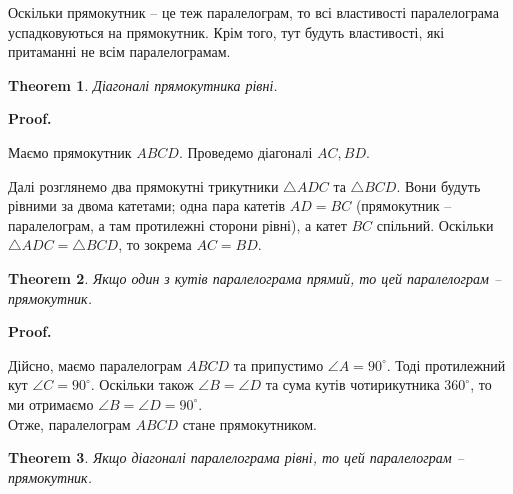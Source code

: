 \documentclass[a4paper, 10pt]{article}
\makeatletter
\def\qed{$\blacksquare$}
\theoremstyle{theoremdd}
\newtheorem{theorem}{Theorem}[subsection]
\theoremstyle{theoremdd}
\theoremstyle{theoremdd}
\theoremstyle{theoremdd}
\theoremstyle{theoremdd}
\theoremstyle{theoremdd}
\theoremstyle{theoremdd}
\theoremstyle{theoremdd}
\theoremstyle{theoremdd}
\renewenvironment{proof}[1][Proof.\\]{\par
\pushQED{\hfill \qed}%
\normalfont \topsep6\p@\@plus6\p@\relax
\trivlist
\item\relax
{\bfseries
#1\@addpunct{.}}\hspace\labelsep\ignorespaces
}{%
\popQED\endtrivlist\@endpefalse
}
\makeatother
\begin{document}
Оскільки прямокутник -- це теж паралелограм, то всі властивості паралелограма успадковуються на прямокутник. Крім того, тут будуть властивості, які притаманні не всім паралелограмам.

\begin{theorem}
Діагоналі прямокутника рівні.
\end{theorem}

\begin{proof}
Маємо прямокутник $ABCD$. Проведемо діагоналі $AC, BD$.
\begin{figure}[H]
\centering
{}
\end{figure}
Далі розглянемо два прямокутні трикутники $\triangle ADC$ та $\triangle BCD$. Вони будуть рівними за двома катетами; одна пара катетів $AD = BC$ (прямокутник -- паралелограм, а там протилежні сторони рівні), а катет $BC$ спільний. Оскільки $\triangle ADC = \triangle BCD$, то зокрема $AC = BD$.
\end{proof}

\begin{theorem}
Якщо один з кутів паралелограма прямий, то цей паралелограм -- прямокутник.
\end{theorem}

\begin{proof}
Дійсно, маємо паралелограм $ABCD$ та припустимо $\angle A = 90^\circ$. Тоді протилежний кут $\angle C = 90^\circ$. Оскільки також $\angle B = \angle D$ та сума кутів чотирикутника $360^\circ$, то ми отримаємо $\angle B = \angle D = 90^\circ$.\\
Отже, паралелограм $ABCD$ стане прямокутником.
\end{proof}

\begin{theorem}
Якщо діагоналі паралелограма рівні, то цей паралелограм -- прямокутник.
\end{theorem}
\end{document}

